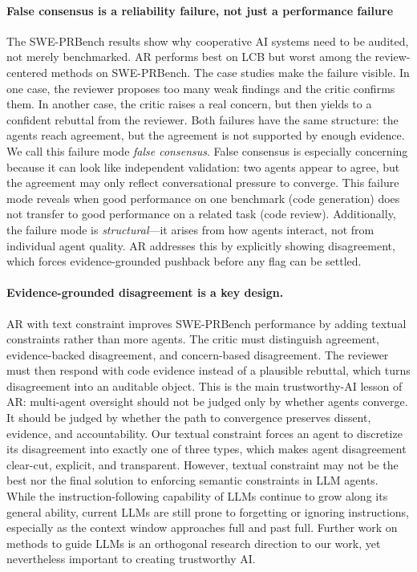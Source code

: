 \documentclass{article}
\begin{document}
\paragraph{False consensus is a reliability failure, not just a performance failure}
The SWE-PRBench results show why cooperative AI systems need to be
audited, not merely benchmarked. AR performs best on LCB but worst
among the review-centered methods on SWE-PRBench. The case studies make
the failure visible. In one case, the reviewer proposes too many weak
findings and the critic confirms them. In another case, the critic
raises a real concern, but then yields to a confident rebuttal from the
reviewer. Both failures have the same structure: the agents reach
agreement, but the agreement is not supported by enough evidence. We
call this failure mode \emph{false consensus}. False consensus is
especially concerning because it can look like independent validation:
two agents appear to agree, but the agreement may only reflect
conversational pressure to converge. This failure mode reveals when good performance on one benchmark (code generation) does not transfer to good performance on a related task (code review). Additionally, the failure mode is \emph{structural}---it arises from how agents interact, not from individual agent quality. AR addresses this by explicitly showing disagreement, which forces evidence-grounded pushback before any flag can be settled.

\paragraph{Evidence-grounded disagreement is a key design.}
AR with text constraint improves SWE-PRBench performance by adding textual constraints
rather than more agents. The critic must distinguish agreement,
evidence-backed disagreement, and concern-based disagreement. The
reviewer must then respond with code evidence instead of a plausible
rebuttal, which turns disagreement into an auditable object. This is the main trustworthy-AI lesson of AR:
multi-agent oversight should not be judged only by whether agents
converge. It should be judged by whether the path to convergence
preserves dissent, evidence, and accountability. Our textual constraint forces an agent to discretize its disagreement into exactly one of three types, which makes agent disagreement clear-cut, explicit, and transparent. However, textual constraint may not be the best nor the final solution to enforcing semantic constraints in LLM agents. While the instruction-following capability of LLMs continue to grow along its general ability, current LLMs are still prone to forgetting or ignoring instructions, especially as the context window approaches full and past full. Further work on methods to guide LLMs is an orthogonal research direction to our work, yet nevertheless important to creating trustworthy AI.
\end{document}
